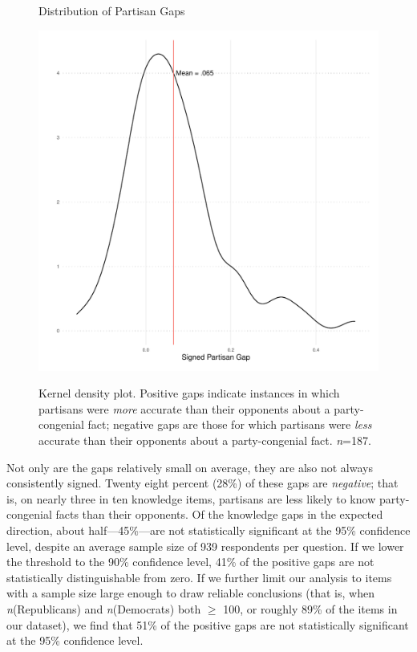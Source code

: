\documentclass[12pt, letterpaper]{article}
\begin{document}
\begin{center}
\begin{figure}[H]
  \centering
  \caption{Distribution of Partisan Gaps}
  \includegraphics[scale=.8]{../figs/partisan_gap_density.pdf}
  \label{fig:figbias}
  \caption*{Kernel density plot. Positive gaps indicate instances in which partisans were \textit{more} accurate than their opponents about a party-congenial fact; negative gaps are those for which partisans were \textit{less} accurate than their opponents about a party-congenial fact. \textit{n}=187.}
\end{figure}
\end{center}

\vspace{-10mm}

Not only are the gaps relatively small on average, they are also not always consistently signed. Twenty eight percent (28\%) of these gaps are \textit{negative}; that is, on nearly three in ten knowledge items, partisans are less likely to know party-congenial facts than their opponents. Of the knowledge gaps in the expected direction, about half---45\%---are not statistically significant at the 95\% confidence level, despite an average sample size of 939 respondents per question. If we lower the threshold to the 90\% confidence level, 41\% of the positive gaps are not statistically distinguishable from zero. If we further limit our analysis to items with a sample size large enough to draw reliable conclusions (that is, when \textit{n}(Republicans) and \textit{n}(Democrats) both $\geq$ 100, or roughly 89\% of the items in our dataset), we find that 51\% of the positive gaps are not statistically significant at the 95\% confidence level.
\end{document}
